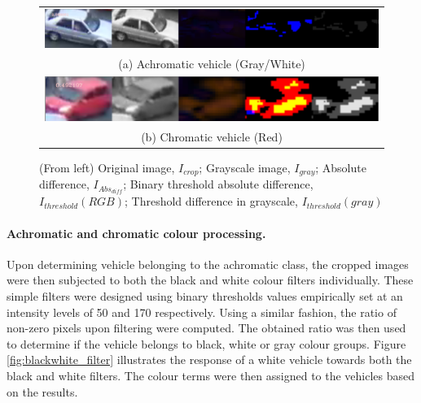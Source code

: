 \begin{figure}[htb!]
  \centering
\begin{tabular}{c}
 \includegraphics[width=0.9\linewidth]{image/general/achromatic_threshold5.PNG} \\
 (a) Achromatic vehicle (Gray/White) \\
 \includegraphics[width=0.9\linewidth]{image/general/achromatic_threshold_color2.PNG}\\
(b) Chromatic vehicle (Red)
\end{tabular}
\caption{(From left) Original image, $I_{crop}$; Grayscale image, $I_{gray}$; Absolute difference, $I_{Abs_{diff}}$; Binary threshold absolute difference, $I_{threshold}(RGB)$; Threshold difference in grayscale, $I_{threshold}(gray)$} \label{fig:achromatic_thresh}
\end{figure}



\paragraph{Achromatic and chromatic colour processing.} Upon determining vehicle belonging to the achromatic class, the cropped images were then subjected to both the black and white colour filters individually. These simple filters were designed using binary thresholds values empirically set at an intensity levels of 50 and 170 respectively.
Using a similar fashion, the ratio of non-zero pixels upon filtering were computed. The obtained ratio was then used to determine if the vehicle belongs to black, white or gray colour groups. Figure \ref{fig:blackwhite_filter} illustrates the response of a white vehicle towards both the black and white filters.
The colour terms were then assigned to the vehicles based on the results.

